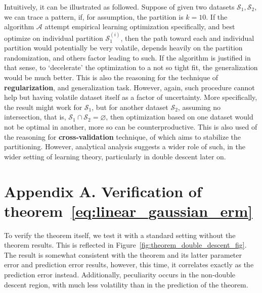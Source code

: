 \documentclass[10pt]{article} %
\begin{document}
Intuitively, it can be illustrated as followed. Suppose of given two datasets $\mathcal{S}_{1},\mathcal{S}_{2}$, we can trace a pattern, if, for assumption, the partition is $k=10$. If the algorithm $\mathcal{A}$ attempt empirical learning optimization specifically, and best optimize on individual partition $\mathcal{S}_{1}^{(i)}$, then the path toward each and individual partition would potentially be very volatile, depends heavily on the partition randomization, and others factor leading to such. If the algorithm is justified in that sense, to `decelerate' the optimization to a not so tight fit, the generalization would be much better. This is also the reasoning for the technique of \textbf{regularization}, and generalization task. However, again, such procedure cannot help but having volatile dataset itself as a factor of uncertainty. More specifically, the result might work for $\mathcal{S}_{1}$, but for another dataset $\mathcal{S}_{2}$, assuming no intersection, that is, $\mathcal{S}_{1}\cap \mathcal{S}_{2}=\varnothing$, then optimization based on one dataset would not be optimal in another, more so can be counterproductive. This is also used of the reasoning for \textbf{cross-validation} technique, of which aims to stabilize the partitioning. However, analytical analysis suggests a wider role of such, in the wider setting of learning theory, particularly in double descent later on. 

\clearpage




\clearpage

\appendix
\section*{Appendix A. Verification of theorem~\ref{eq:linear_gaussian_erm}}

To verify the theorem itself, we test it with a standard setting without the theorem results. This is reflected in Figure~\ref{fig:theorem_double_descent_fig}. The result is somewhat consistent with the theorem and its latter parameter error and prediction error results, however, this time, it correlates exactly as the prediction error instead. Additionally, peculiarity occurs in the non-double descent region, with much less volatility than in the prediction of the theorem. 
\end{document}
